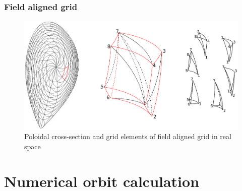 \documentclass{beamer}
\begin{document}
\begin{frame}
\frametitle{Field aligned grid}
\vspace{-1cm}
		\begin{center}
			\begin{figure}
				\includegraphics[trim={0cm 0cm 0cm 0cm},clip,width=1\textwidth]{FIGURES/Curvilinear_grid_and_tetrahedra.eps}
				\caption{Poloidal cross-section and grid elements of field aligned grid in real space}
			\end{figure}
		\end{center}
\end{frame}





\section{Numerical orbit calculation}
\end{document}
